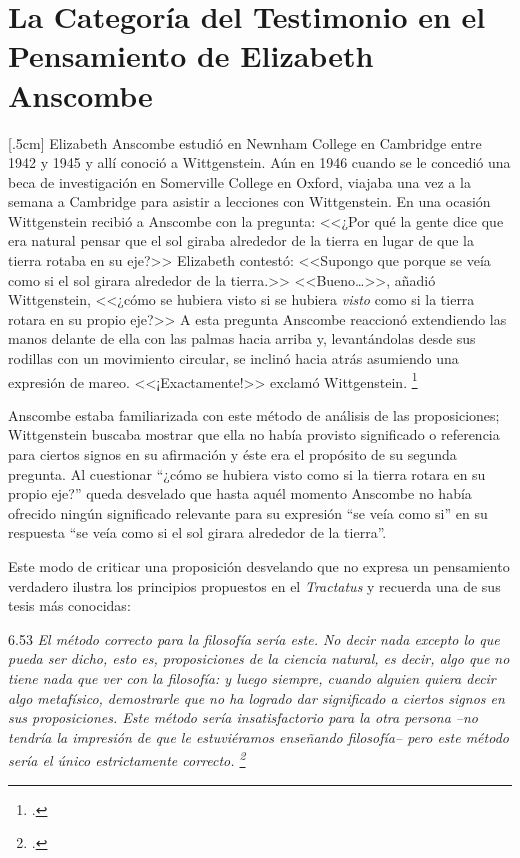 \documentclass[../main.tex]{subfiles}
\begin{document}
\chapter*{La Categoría del Testimonio en el Pensamiento de Elizabeth Anscombe}


[.5cm]
Elizabeth Anscombe estudió en Newnham College en Cambridge entre 1942 y 1945 y allí conoció a Wittgenstein. Aún en 1946 cuando se le concedió una beca de investigación en Somerville College en Oxford, viajaba una vez a la semana a Cambridge para asistir a lecciones con Wittgenstein. En una ocasión Wittgenstein recibió a Anscombe con la pregunta: <<¿Por qué la gente dice que era natural pensar que el sol giraba alrededor de la tierra en lugar de que la tierra rotaba en su eje?>> Elizabeth contestó: <<Supongo que porque se veía como si el sol girara alrededor de la tierra.>> <<Bueno\ldots>>, añadió Wittgenstein, <<¿cómo se hubiera visto si se hubiera \emph{visto} como si la tierra rotara en su propio eje?>> A esta pregunta Anscombe reaccionó extendiendo las manos delante de ella con las palmas hacia arriba y, levantándolas desde sus rodillas con un movimiento circular, se inclinó hacia atrás asumiendo una expresión de mareo. <<¡Exactamente!>> exclamó Wittgenstein. \footcite[151]{IWT}

Anscombe estaba familiarizada con este método de análisis de las proposiciones; Wittgenstein buscaba mostrar que ella no había provisto significado o referencia para ciertos signos en su afirmación y éste era el propósito de su segunda pregunta. Al cuestionar ``¿cómo se hubiera visto como si la tierra rotara en su propio eje?'' queda desvelado que hasta aquél momento Anscombe no había ofrecido ningún significado relevante para su expresión ``se veía como si'' en su respuesta ``se veía como si el sol girara alrededor de la tierra''. 

Este modo de criticar una proposición desvelando que no expresa un pensamiento verdadero ilustra los principios propuestos en el \emph{Tractatus} y recuerda una de sus tesis más conocidas: 

6.53 \emph{El método correcto para la filosofía sería este. No decir nada excepto lo que pueda ser dicho, esto es, proposiciones de la ciencia natural, es decir, algo que no tiene nada que ver con la filosofía: y luego siempre, cuando alguien quiera decir algo metafísico, demostrarle que no ha logrado dar significado a ciertos signos en sus proposiciones. Este método sería insatisfactorio para la otra persona --no tendría la impresión de que le estuviéramos enseñando filosofía-- pero este método sería el único estrictamente correcto. \footcite[p. 107--108]{tractatus}}
\end{document}
